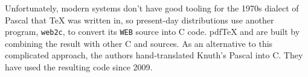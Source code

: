 Unfortunately, modern systems don't have good tooling for the 1970s
dialect of Pascal that \TeX{} was written in,
so present-day distributions use another program,
\texttt{web2c}, to convert its \texttt{WEB} source into C code.
pdf\TeX{} and \XeTeX{} are built by combining the result with other C
and \cpp{} sources.
As an alternative to this complicated approach,
the \LuaTeX{} authors hand-translated Knuth's Pascal into C.
They have used the resulting code since 2009.\punckern{}

